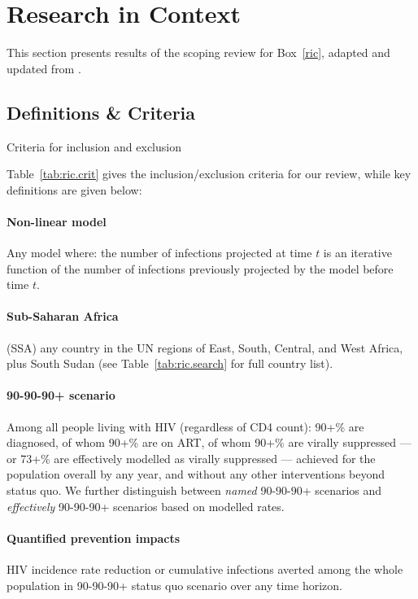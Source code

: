 \section{Research in Context}\label{sr.ric}

This section presents results of the scoping review for Box~\ref{ric},
adapted and updated from \cite{Knight2022sr}.
\subsection{Definitions \& Criteria}\label{sr.ric.def}
\begin{table}[h]
  \centering
  \caption{Criteria for inclusion and exclusion}
  
  \label{tab:ric.crit}
\end{table}
Table~\ref{tab:ric.crit} gives the inclusion/exclusion criteria for our review,
while key definitions are given below:
\paragraph{Non-linear model}
Any model where:
the number of infections projected at time $t$ is an iterative function of
the number of infections previously projected by the model before time $t$.
\paragraph{Sub-Saharan Africa} (SSA)
any country in the UN regions of East, South, Central, and West Africa, plus South Sudan
(see Table~\ref{tab:ric.search} for full country list).
\paragraph{90-90-90+ scenario}
Among all people living with HIV (regardless of CD4 count):
90+\% are diagnosed, of whom 90+\% are on ART, of whom 90+\% are virally suppressed
--- or 73+\% are effectively modelled as virally suppressed ---
achieved for the population overall by any year,
and without any other interventions beyond status quo.
We further distinguish between
\emph{named} 90-90-90+ scenarios and
\emph{effectively} 90-90-90+ scenarios based on modelled rates.
\paragraph{Quantified prevention impacts}
HIV incidence rate reduction or cumulative infections averted among the whole population
in 90-90-90+ \vs status quo scenario over any time horizon.
